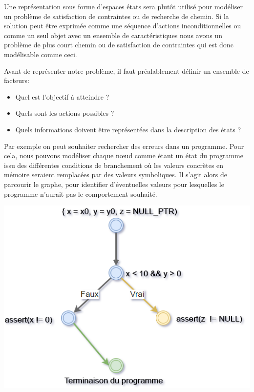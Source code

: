 Une représentation sous forme d'espaces états sera plutôt utilisé pour modéliser un problème de satisfaction de contraintes ou de recherche de chemin.
Si la solution peut être exprimée comme une séquence d'actions inconditionnelles ou comme un seul objet avec un ensemble de caractéristiques nous avons un problème de plus court chemin ou de satisfaction de contraintes qui est donc modélisable comme ceci.

Avant de représenter notre problème, il faut préalablement définir un ensemble de facteurs:
\begin{itemize}
\item Quel est l'objectif à atteindre ?
\item Quels sont les actions possibles ?
\item Quels informations doivent être représentées dans la description des états ?
\end{itemize}

Par exemple on peut souhaiter rechercher des erreurs dans un programme. Pour cela, nous pouvons modéliser chaque nœud comme étant un état du programme issu des différentes conditions de branchement où les valeurs concrètes en mémoire seraient remplacées par des valeurs symboliques. Il s'agit alors de parcourir le graphe, pour identifier d'éventuelles valeurs pour lesquelles le programme n'aurait pas le comportement souhaité.

\begin{center}
    \includegraphics[scale=0.6]{../ressources/images/state_space_graph.png}
\end{center}

